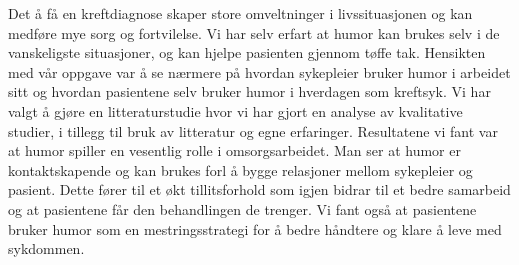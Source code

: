 Det å få en kreftdiagnose skaper store omveltninger i livssituasjonen og kan
medføre mye sorg og fortvilelse. Vi har selv erfart at humor kan brukes selv i
de vanskeligste situasjoner, og kan hjelpe pasienten gjennom tøffe tak.
Hensikten med vår oppgave var å se nærmere på hvordan sykepleier bruker humor i
arbeidet sitt og hvordan pasientene selv bruker humor i hverdagen som kreftsyk.
Vi har valgt å gjøre en litteraturstudie hvor vi har gjort en analyse av
kvalitative studier, i tillegg til bruk av litteratur og egne erfaringer.
Resultatene vi fant var at humor spiller en vesentlig rolle i omsorgsarbeidet.
Man ser at humor er kontaktskapende og kan brukes forl å bygge relasjoner
mellom sykepleier og pasient. Dette fører til et økt tillitsforhold som igjen
bidrar til et bedre samarbeid og at pasientene får den behandlingen de trenger.
Vi fant også at pasientene bruker humor som en mestringsstrategi for å bedre
håndtere og klare å leve med sykdommen.

